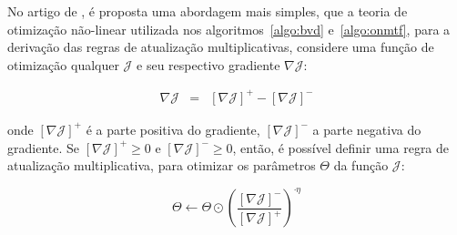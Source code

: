\documentclass[
    12pt,                %
    oneside,            %
    a4paper,            %
    english,            %
    brazil                %
    ]{abntex2ppgsi}
\begin{document}



No artigo de , é proposta uma abordagem mais simples, que a teoria de otimização não-linear utilizada nos algoritmos~\ref{algo:bvd} e~\ref{algo:onmtf}, para a derivação das regras de atualização multiplicativas, considere uma função de otimização qualquer $\mathcal{J}$ e seu respectivo gradiente $\nabla \mathcal{J}$:

\[
\begin{array}{lclcl}
\nabla \mathcal{J} & = & [\nabla \mathcal{J}]^+ - [\nabla \mathcal{J}]^-
\end{array}
\]

onde $[\nabla \mathcal{J}]^+$ é a parte positiva do gradiente, $[\nabla \mathcal{J}]^-$ a parte negativa do gradiente.
Se $[\nabla \mathcal{J}]^+ \geq 0$ e $[\nabla \mathcal{J}]^- \geq 0$, então, é possível definir uma regra de atualização multiplicativa, para otimizar os parâmetros $\Theta$ da função $\mathcal{J}$:

\begin{equation}
\label{eq:onmtf:updateTheta}
\Theta \gets \Theta \odot \left ( \frac{ [\nabla \mathcal{J}]^- }{ [\nabla \mathcal{J}]^+ } \right )^{\cdot \eta}
\end{equation}
\end{document}
